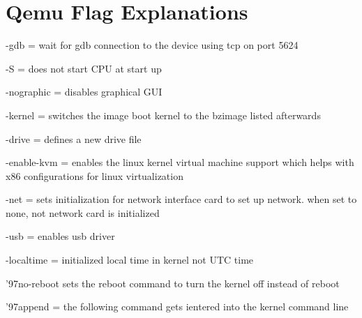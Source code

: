 \documentclass[draftclsnofoot,onecolumn,10pt]{article}
\begin{document}
    \section{Qemu Flag Explanations}
    \begin{flushleft}
    -gdb = wait for gdb connection to the device using tcp on port 5624\
    \end{flushleft}
    \begin{flushleft}
-S = does not start CPU at start up\
    \end{flushleft}
    \begin{flushleft}
-nographic = disables graphical GUI\
    \end{flushleft}
    \begin{flushleft}
-kernel = switches the image boot kernel to the bzimage listed afterwards\
    \end{flushleft}
    \begin{flushleft}
-drive = defines a new drive file\
    \end{flushleft}
    \begin{flushleft}
-enable-kvm = enables the linux kernel virtual machine support which helps with x86 configurations for linux virtualization\
    \end{flushleft}
    \begin{flushleft}
-net = sets initialization for network interface card to set up network. when set to none, not network card is initialized\
    \end{flushleft}
    \begin{flushleft}
-usb = enables usb driver\
    \end{flushleft}
    \begin{flushleft}
-localtime = initialized local time in kernel not UTC time\
    \end{flushleft}
    \begin{flushleft}
'97no-reboot sets the reboot command to turn the kernel off instead of reboot\
    \end{flushleft}
    \begin{flushleft}
'97append = the following command gets ientered into the kernel command line\
    \end{flushleft}
\end{document}
